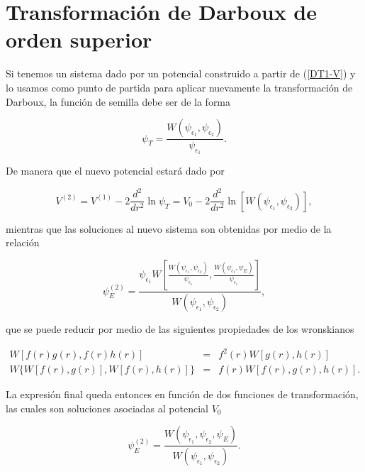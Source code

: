 \section{Transformación de Darboux de orden superior}

Si tenemos un sistema dado por un potencial construido a partir de (\ref{DT1-V}) y lo usamos como punto de partida para aplicar nuevamente la transformación de Darboux, la función de semilla debe ser de la forma

\begin{equation*}
	\psi_T = \frac{W(\psi_{\epsilon_1},\psi_{\epsilon_2})}{\psi_{\epsilon_1}}.
\end{equation*}

De manera que el nuevo potencial estará dado por 

\begin{equation}
\label{TD2-V}
V^{(2)}=V^{(1)} - 2 \frac{d^2}{dr^2} \ln \psi_T = V_0 - 2  \frac{d^2}{dr^2} \ln [{W(\psi_{\epsilon_1},\psi_{\epsilon_2})}],
\end{equation}

mientras que las soluciones al nuevo sistema son obtenidas por medio de la relación

\begin{equation*}
\psi_E^{(2)} = \frac{\psi_{\epsilon_1}W \left[\frac{ W(\psi_{\epsilon_1},\psi_{\epsilon_2})}{\psi_{\epsilon_1}},\frac{W(\psi_{\epsilon_1},\psi_{E})}{\psi_{\epsilon_1}}\right]}{W(\psi_{\epsilon_1},\psi_{\epsilon_2})},
\end{equation*}

que se puede reducir por medio de las siguientes propiedades de los wronskianos

\begin{eqnarray*}
W[f(r)g(r),f(r)h(r)] &=& f^2(r) W[g(r),h(r)]
\\
W\{W[f(r),g(r)],W[f(r),h(r)]\} &=& f(r) W[f(r),g(r),h(r)].
\end{eqnarray*}

La expresión final queda entonces en función de dos funciones de transformación, las cuales son soluciones asociadas al potencial $V_0$

\begin{equation}
\label{TD2-Psi}
\psi_E^{(2)} = \frac{W(\psi_{\epsilon_1},\psi_{\epsilon_2},\psi_E)}{W(\psi_{\epsilon_1},\psi_{\epsilon_2})}.
\end{equation}

